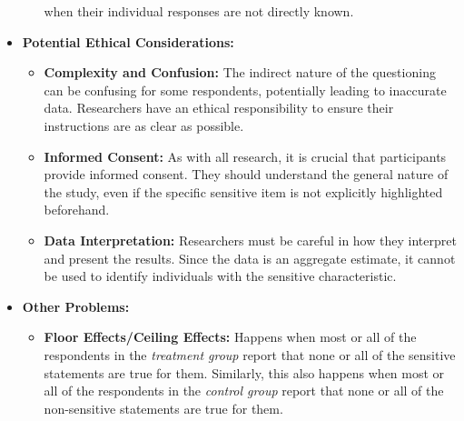 \documentclass{article}
\begin{document}
\begin{itemize}
\begin{itemize}
            when their individual responses are not directly known.
        \end{itemize}
        \item \textbf{Potential Ethical Considerations:}
        \begin{itemize}
            \item \textbf{Complexity and Confusion:} The indirect nature of
            the questioning can be confusing for some respondents,
            potentially leading to inaccurate data. Researchers have an
            ethical responsibility to ensure their instructions are as clear
            as possible.
            \item \textbf{Informed Consent:} As with all research, it is
            crucial that participants provide informed consent. They should
            understand the general nature of the study, even if the specific
            sensitive item is not explicitly highlighted beforehand.
            \item \textbf{Data Interpretation:} Researchers must be careful
            in how they interpret and present the results. Since the data is
            an aggregate estimate, it cannot be used to identify individuals
            with the sensitive characteristic.
        \end{itemize}
        \item \textbf{Other Problems:}
        \begin{itemize}
            \item \textbf{Floor Effects/Ceiling Effects:} Happens when most
            or all of the respondents in the \textit{treatment group} report
            that none or all of the sensitive statements are true for them.
            Similarly, this also happens when most or all of the respondents
            in the \textit{control group} report that none or all of the
            non-sensitive statements are true for them.
        \end{itemize}
    \end{itemize}
\end{document}
